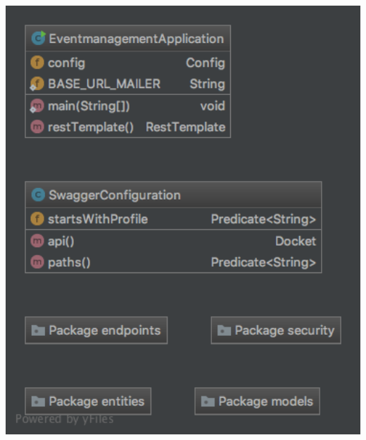 \documentclass[11pt]{article} %
\begin{document}
\includegraphics[width=1.0\textwidth]{class-diagrams/Eventmanagement-00}
\\
\\
\end{document}
